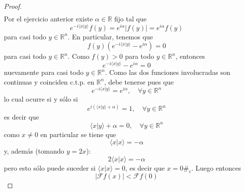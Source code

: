 \documentclass[12pt]{report}
\theoremstyle{largebreak}
\newcommand\abs[1]{\ensuremath{\left|#1\right|}}
\newcommand\pint[2]{\ensuremath{\langle#1| #2\rangle}}
\newcommand{\fou}[1]{\ensuremath{\mathcal{F}#1}}
\newcommand{\contradiction}{\ensuremath{\#_c}}
\begin{document}
\begin{proof}
\begin{equation*}
\begin{split}
            \end{split}
        \end{equation*}
        Por el ejercicio anterior existe $\alpha\in\mathbb{R}$ fijo tal que
        \begin{equation*}
            e^{ -i\pint{x}{y}}f(y)=e^{ i\alpha}\abs{f(y)}=e^{ i\alpha}f(y)
        \end{equation*}
        para casi todo $y\in\mathbb{R}^n$. En particular, tenemos que
        \begin{equation*}
            f(y)\left(e^{-i\pint{x}{y}}-e^{i\alpha}\right)=0
        \end{equation*}
        para casi todo $y\in\mathbb{R}^n$. Como $f(y)>0$ para todo $y\in\mathbb{R}^n$, entonces
        \begin{equation*}
            e^{-i\pint{x}{y}}-e^{i\alpha}=0
        \end{equation*}
        nuevamente para casi todo $y\in\mathbb{R}^n$. Como las dos funciones involucradas son continuas y coinciden c.t.p. en $\mathbb{R}^n$, debe tenerse pues que
        \begin{equation*}
            e^{-i\pint{x}{y}}=e^{i\alpha},\quad\forall y\in\mathbb{R}^n
        \end{equation*}
        lo cual ocurre si y sólo si
        \begin{equation*}
            e^{i(\pint{x}{y}+\alpha)}=1,\quad\forall y\in\mathbb{R}^n
        \end{equation*}
        es decir que
        \begin{equation*}
            \pint{x}{y}+\alpha=0,\quad\forall y\in\mathbb{R}^n
        \end{equation*}
        como $x\neq0$ en particular se tiene que
        \begin{equation*}
            \pint{x}{x}=-\alpha
        \end{equation*}
        y, además (tomando $y=2x$):
        \begin{equation*}
            2\pint{x}{x}=-\alpha
        \end{equation*}
        pero esto sólo puede suceder si $\pint{x}{x}=0$, es decir que $x=0$\contradiction. Luego entonces
        \begin{equation*}
            \abs{\fou{f}(x)}<\fou{f}(0)
        \end{equation*}
    \end{proof}
\end{document}
